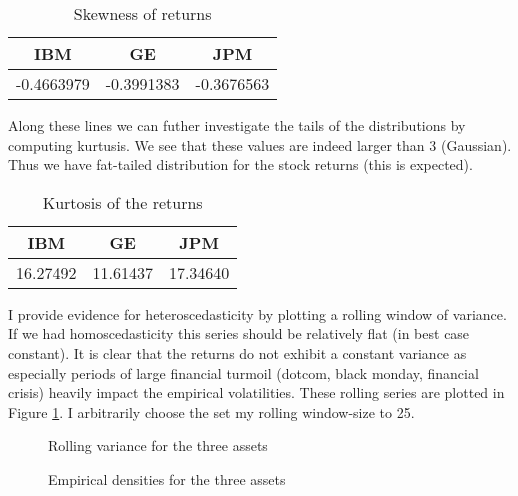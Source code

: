 \documentclass{EconHomework}
\begin{document}
\begin{table}[H]
    \centering
    \begin{tabular}{ c c c }
        \textbf{IBM} & \textbf{GE} & \textbf{JPM} \\
        \hline
        -0.4663979 & -0.3991383 & -0.3676563  \\
    \end{tabular}
    \caption{Skewness of returns}
\end{table}

Along these lines we can futher investigate the tails of the distributions by computing kurtusis. We see that these values are indeed larger than 3 (Gaussian). Thus we have fat-tailed distribution for the stock returns (this is expected).

\begin{table}[H]
    \centering
    \begin{tabular}{ c c c }
        \textbf{IBM} & \textbf{GE} & \textbf{JPM} \\
        \hline
        16.27492 & 11.61437 & 17.34640   \\
    \end{tabular}
    \caption{Kurtosis of the returns}
\end{table}

I provide evidence for heteroscedasticity by plotting a rolling window of variance. If we had homoscedasticity this series should be relatively flat (in best case constant). It is clear that the returns do not exhibit a constant variance as especially periods of large financial turmoil (dotcom, black monday, financial crisis) heavily impact the empirical volatilities. These rolling series are plotted in Figure \ref{rolling_variance}. I arbitrarily choose the set my rolling window-size to 25.


\begin{figure}[htbp]
  \centering
  
  \caption{Rolling variance for the three assets}
  \label{rolling_variance}
\end{figure}

\begin{figure}[htbp]
  \centering
  
  \caption{Empirical densities for the three assets}
  \label{empirical_density}
\end{figure}

\pagebreak
\end{document}
